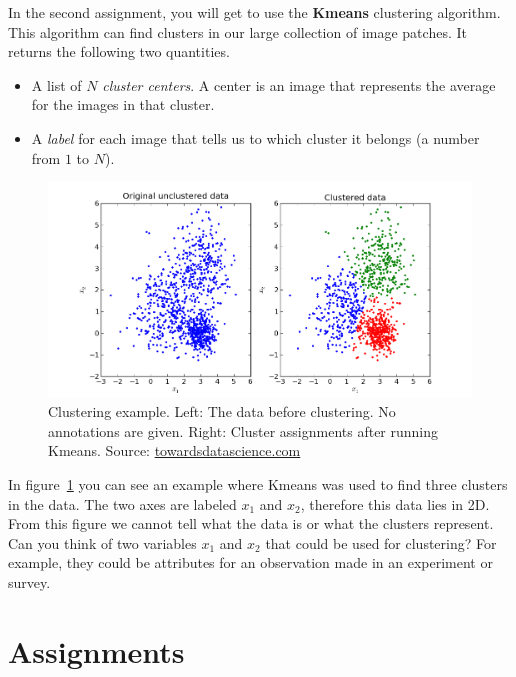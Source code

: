 \documentclass[a4paper]{article}
\begin{document}
		In the second assignment, you will get to use the \textbf{Kmeans} clustering algorithm. 
		This algorithm can find clusters in our large collection of image patches.
		It returns the following two quantities.
		\begin{itemize}
			\item A list of $N$ \emph{cluster centers}. 
			A center is an image that represents the average for the images in that cluster.
			\item A \emph{label} for each image that tells us to which cluster it belongs (a number from $1$ to $N$).
		\end{itemize}
		\begin{figure}[tb]
			\centering
			\includegraphics[width=0.8\linewidth]{clustering-example}
			\caption{
				Clustering example. 
				Left: The data before clustering. No annotations are given.
				Right: Cluster assignments after running Kmeans.
				Source: \href{https://towardsdatascience.com/k-means-data-clustering-bce3335d2203}{towardsdatascience.com}
			}
			\label{fig:clustering-example}
		\end{figure}
		In figure~\ref{fig:clustering-example} you can see an example where Kmeans was used to find three clusters in the data.
		The two axes are labeled $x_1$ and $x_2$, therefore this data lies in 2D.
		From this figure we cannot tell what the data is or what the clusters represent. 
		Can you think of two variables $x_1$ and $x_2$ that could be used for clustering?
		For example, they could be attributes for an observation made in an experiment or survey.

\section{Assignments}
\end{document}
